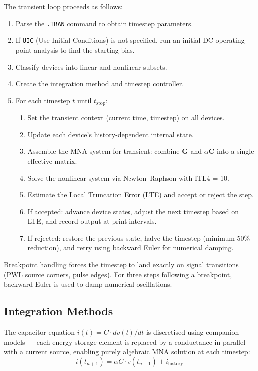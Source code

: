 The transient loop proceeds as follows:
\begin{enumerate}
  \item Parse the \texttt{.TRAN} command to obtain timestep parameters.
  \item If \texttt{UIC} (Use Initial Conditions) is not specified, run an initial DC operating point analysis to find the starting bias.
  \item Classify devices into linear and nonlinear subsets.
  \item Create the integration method and timestep controller.
  \item For each timestep $t$ until $t_{\text{stop}}$:
  \begin{enumerate}
    \item Set the transient context (current time, timestep) on all devices.
    \item Update each device's history-dependent internal state.
    \item Assemble the MNA system for transient: combine $\mathbf{G}$ and $\alpha\mathbf{C}$ into a single effective matrix.
    \item Solve the nonlinear system via Newton--Raphson with ITL4 = 10.
    \item Estimate the Local Truncation Error (LTE) and accept or reject the step.
    \item If accepted: advance device states, adjust the next timestep based on LTE, and record output at print intervals.
    \item If rejected: restore the previous state, halve the timestep (minimum 50\% reduction), and retry using backward Euler for numerical damping.
  \end{enumerate}
\end{enumerate}

Breakpoint handling forces the timestep to land exactly on signal transitions (PWL source corners, pulse edges). For three steps following a breakpoint, backward Euler is used to damp numerical oscillations.

\subsection{Integration Methods}

The capacitor equation $i(t) = C \cdot dv(t)/dt$ is discretised using companion models --- each energy-storage element is replaced by a conductance in parallel with a current source, enabling purely algebraic MNA solution at each timestep:
\[
i(t_{n+1}) = \alpha C \cdot v(t_{n+1}) + i_{\text{history}}
\]

